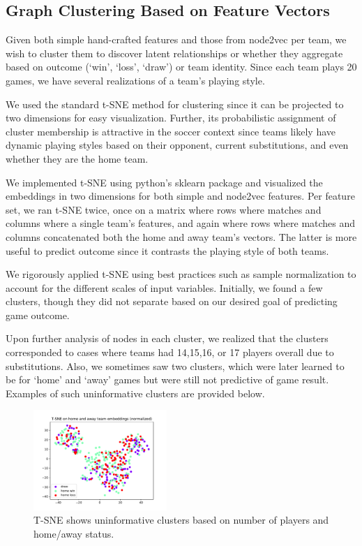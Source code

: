 \subsection{Graph Clustering Based on Feature Vectors}
Given both simple hand-crafted features and those from node2vec per team, we wish to cluster them to discover latent relationships or whether they aggregate based on outcome (`win', `loss', `draw') or team identity. Since each team plays 20 games, we have several realizations of a team's playing style.

We used the standard t-SNE method for clustering since it can be projected to two dimensions for easy visualization. Further, its probabilistic assignment of cluster membership is attractive in the soccer context since teams likely have dynamic playing styles based on their opponent, current substitutions, and even whether they are the home team.

We implemented t-SNE using python's  sklearn package and visualized the embeddings in two dimensions for both simple and node2vec features. Per feature set, we ran t-SNE twice, once on a matrix where rows where matches and columns where a single team's features, and again where rows where matches and columns concatenated both the home and away team's vectors. The latter is more useful to predict outcome since it contrasts the playing style of both teams.

We rigorously applied t-SNE using best practices such as sample normalization to account for the different scales of input variables. Initially, we found a few clusters, though they did not separate based on our desired goal of predicting game outcome.


Upon further analysis of nodes in each cluster, we realized that the clusters corresponded to cases where teams had 14,15,16, or 17 players overall due to substitutions. Also, we sometimes saw two clusters, which were later learned to be for `home' and `away' games but were still not predictive of game result. Examples of such uninformative clusters are provided below. 

\begin{figure}[h]
  \centering
  \includegraphics[width=0.45\textwidth]{plots/game_NORM_tsne.pdf}
  \caption{T-SNE shows uninformative clusters based on number of players and home/away status.}
    \label{fig:tsne_game}
\end{figure}


